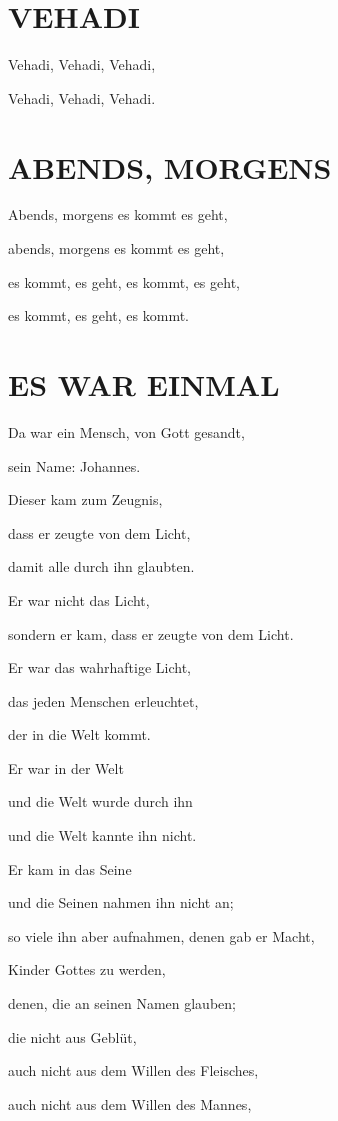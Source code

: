 \documentclass[11pt,a5paper,twoside]{article}
\begin{document}
\section[Vehadi]{VEHADI}

Vehadi, Vehadi, Vehadi,

Vehadi, Vehadi, Vehadi. 

\section[Abends, morgens ]{ABENDS, MORGENS }

Abends, morgens es kommt es geht,

abends, morgens es kommt es geht, 

es kommt, es geht, es kommt, es geht,

es kommt, es geht, es kommt.

\section[Es war einmal]{ES WAR EINMAL}

Da war ein Mensch, von Gott gesandt, 

sein Name: Johannes.

Dieser kam zum Zeugnis, 

dass er zeugte von dem Licht,

damit alle durch ihn glaubten.

Er war nicht das Licht, 

sondern er kam, dass er zeugte von dem Licht.

Er war das wahrhaftige Licht, 

das jeden Menschen erleuchtet,

der in die Welt kommt.

Er war in der Welt

und die Welt wurde durch ihn

und die Welt kannte ihn nicht.

Er kam in das Seine

und die Seinen nahmen ihn nicht an;

so viele ihn aber aufnahmen, denen gab er Macht,

Kinder Gottes zu werden,

denen, die an seinen Namen glauben;

die nicht aus Geblüt, 

auch nicht aus dem Willen des Fleisches, 

auch nicht aus dem Willen des Mannes, 
\end{document}
